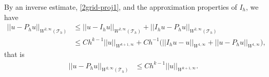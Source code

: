 \documentclass[12pt]{amsart}
\numberwithin{equation}{section}
\newcommand\cof{\operatorname{cof}}
\begin{document}
By an inverse estimate, \eqref{2grid-proj1}, and the approximation properties of $I_h$, we have
\begin{align*}
||u-P_h u||_{W^{2,\infty}(\mathcal{T}_h)} &\leq ||u-I_h u ||_{W^{2,\infty}(\mathcal{T}_h)} + ||I_h u -P_h u||_{W^{2,\infty}(\mathcal{T}_h)} \\
& \leq C h^{k-1} ||u||_{W^{k+1,\infty}}  + C h^{-1} \big(  ||I_h u - u||_{W^{1,\infty}} +  || u-P_h u||_{W^{1,\infty}}  \big),
\end{align*}
that is
\begin{align} 
||u-P_h u||_{W^{2,\infty}(\mathcal{T}_h)} &\leq C h^{k-1} ||u||_{W^{k+1,\infty}} \label{2grid-proj2}. %
\end{align}


\end{document}
